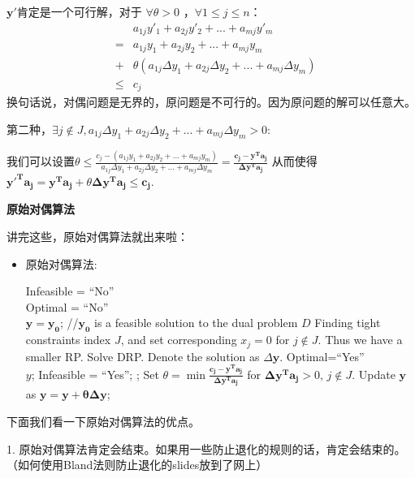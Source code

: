 \documentclass[11pt]{article}
\begin{document}
\begin{CJK}{UTF8}{gbsn}
$\mathbf{y'}$肯定是一个可行解，对于 $\forall \theta > 0$ ，$\forall 1 \leq j \leq n$：
 \begin{eqnarray}
&&  a_{1j}y'_1 + a_{2j}y'_2 + ... + a_{mj}y'_m \\
&=&a_{1j}y_1 + a_{2j}y_2 + ... + a_{mj}y_m \\
&+&\theta(a_{1j}\Delta{y_1} + a_{2j}\Delta{y_2} + ... + a_{mj}\Delta{y_m}) \\
&\leq& c_j
\end{eqnarray}
换句话说，对偶问题是无界的，原问题是不可行的。因为原问题的解可以任意大。

第二种，$\exists j \notin J, a_{1j} \Delta y_1 + a_{2j}\Delta y_2 + ... + a_{mj}\Delta y_m  >  0$:

我们可以设置$\theta \leq \frac{c_j - (a_{1j}y_1 + a_{2j}y_2 + ... + a_{mj}y_m) } {a_{1j}\Delta {y_1} + a_{2j}\Delta {y_2} + ... + a_{mj}\Delta {y_m}} = \frac{ \mathbf{c_j - y^Ta_j} }{ \mathbf{\Delta y^T a_j}  }$ 从而使得$\mathbf{y'^Ta_j} =\mathbf{y^Ta_j} + \theta \mathbf{\Delta y^Ta_j} \leq \mathbf{c_j}$.


\textbf{原始对偶算法}

讲完这些，原始对偶算法就出来啦：
\begin{itemize}
\item 原始对偶算法:
\begin{small}
\begin{algorithmic} [1]
\STATE Infeasible = ``No''\\
       Optimal = ``No''\\
        $\mathbf{y=y_{0}}$; \qquad //$\mathbf{y_{0}}$ is a feasible solution to the dual problem $D$
\STATE Finding tight constraints index $J$, and set corresponding $x_j = 0 $ for $ j\notin J$.
\STATE Thus we have a smaller RP.
\STATE Solve DRP. Denote the solution as $\Delta \mathbf{y}$.
\STATE Optimal=``Yes''\\
\RETURN $y$;
\ENDIF
{}
\STATE Infeasible = ``Yes'';
\RETURN;
\ENDIF
\STATE Set $\theta = \min{ \frac{ \mathbf{c_j - y^Ta_j} }{ \mathbf{\Delta y^T a_j}}}$ for $\mathbf{\Delta y^T a_j}>0$, $j\notin J$.
\STATE Update $\mathbf{ y}$ as  $ \mathbf{ y = y + \theta \Delta y}$;
\ENDWHILE
\end{algorithmic}
\end{small}
\end{itemize}
下面我们看一下原始对偶算法的优点。

1. 原始对偶算法肯定会结束。如果用一些防止退化的规则的话，肯定会结束的。（如何使用Bland法则防止退化的slides放到了网上）


\end{CJK}
\end{document}
